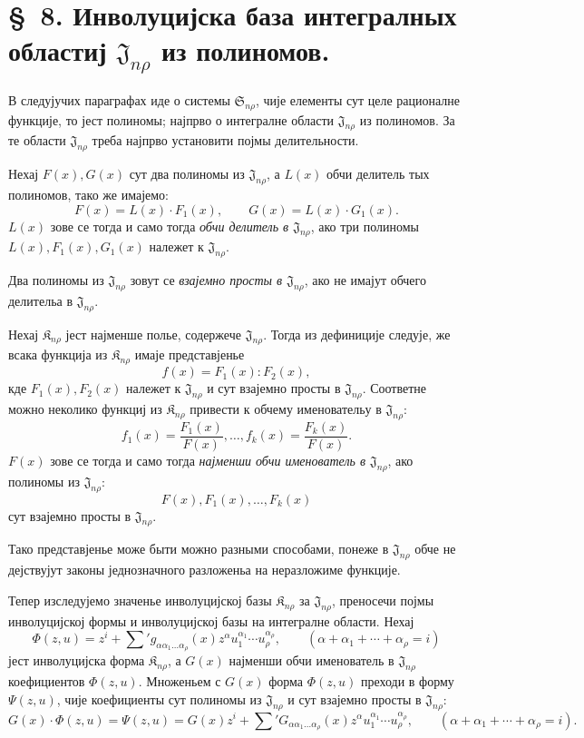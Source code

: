 ﻿\documentclass[11pt]{article}
\providecommand{\Kfield}{\mathfrak{K}}
\providecommand{\Ssys}{\mathfrak{S}}
\providecommand{\Jdom}{\mathfrak{J}}
\begin{document}
\section*{\S\ 8. Инволуцијска база интегралных областиј $\Jdom_{n\rho}$ из полиномов.}

В следујучих параграфах иде о системы $\Ssys_{n\rho}$, чије елементы сут целе рационалне функције, то јест полиномы; најпрво о интегралне области $\Jdom_{n\rho}$ из полиномов. За те области $\Jdom_{n\rho}$ треба најпрво установити појмы делительности.

Нехај $F(x),G(x)$ сут два полиномы из $\Jdom_{n\rho}$, а $L(x)$ обчи делитель тых полиномов, тако же имајемо:
\[
  F(x)=L(x)\cdot F_1(x),\qquad G(x)=L(x)\cdot G_1(x).
\]
$L(x)$ зове се тогда и само тогда {\itshape обчи делитель в $\Jdom_{n\rho}$}, ако три полиномы $L(x),F_1(x),G_1(x)$ належет к $\Jdom_{n\rho}$.

Два полиномы из $\Jdom_{n\rho}$ зовут се {\itshape взајемно просты в $\Jdom_{n\rho}$}, ако не имајут обчего делительа в $\Jdom_{n\rho}$.

Нехај $\Kfield_{n\rho}$ јест најменше полье, содержече $\Jdom_{n\rho}$. Тогда из дефиниције следује, же всака функција из $\Kfield_{n\rho}$ имаје представјенье
\[
  f(x)=F_1(x):F_2(x),
\]
кде $F_1(x),F_2(x)$ належет к $\Jdom_{n\rho}$ и сут взајемно просты в $\Jdom_{n\rho}$. Соответне можно неколико функциј из $\Kfield_{n\rho}$ привести к обчему именовательу в $\Jdom_{n\rho}$:
\[
  f_1(x)=\frac{F_1(x)}{F(x)},\ldots,
  f_k(x)=\frac{F_k(x)}{F(x)}.
\]
$F(x)$ зове се тогда и само тогда {\itshape најменши обчи именователь в $\Jdom_{n\rho}$}, ако полиномы из $\Jdom_{n\rho}$:
\[
  F(x),F_1(x),\ldots,F_k(x)
\]
сут взајемно просты в $\Jdom_{n\rho}$.

Тако представјенье може быти можно разными способами, понеже в $\Jdom_{n\rho}$ обче не дејствујут законы једнозначного разложеньа на неразложиме функције.

Тепер изследујемо значенье инволуцијској базы $\Kfield_{n\rho}$ за $\Jdom_{n\rho}$, преносечи појмы инволуцијској формы и инволуцијској базы на интегралне области. Нехај
\[
  \Phi(z,u)=z^i+\sum{}' g_{\alpha\alpha_1\ldots\alpha_\rho}(x)
  z^\alpha u_1^{\alpha_1}\cdots u_\rho^{\alpha_\rho},
  \qquad
  (\alpha+\alpha_1+\cdots+\alpha_\rho=i)
\]
јест инволуцијска форма $\Kfield_{n\rho}$, а $G(x)$ најменши обчи именователь в $\Jdom_{n\rho}$ коефициентов $\Phi(z,u)$. Множеньем с $G(x)$ форма $\Phi(z,u)$ преходи в форму $\Psi(z,u)$, чије коефициенты сут полиномы из $\Jdom_{n\rho}$ и сут взајемно просты в $\Jdom_{n\rho}$:
\[
  G(x)\cdot\Phi(z,u)=\Psi(z,u)
  =G(x)z^i+
  \sum{}' G_{\alpha\alpha_1\ldots\alpha_\rho}(x)
  z^\alpha u_1^{\alpha_1}\cdots u_\rho^{\alpha_\rho},
  \qquad
  (\alpha+\alpha_1+\cdots+\alpha_\rho=i).
\]
\end{document}

